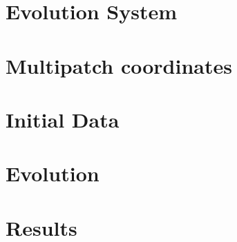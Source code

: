 

\section{Evolution System}
\label{ch:wave_scattering:sec:system}


\section{Multipatch coordinates}
\label{ch:wave_scattering:sec:multipatch}


\section{Initial Data}
\label{ch:wave_scattering:sec:id}


\section{Evolution}
\label{ch:wave_scattering:sec:code}


\section{Results}
\label{ch:wave_scattering:sec:results}
